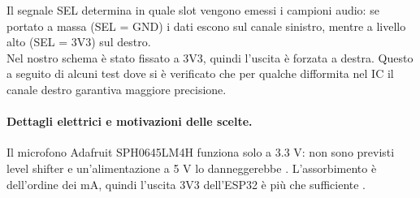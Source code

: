   
  \begin{table}[H]
    \centering
    \label{tab:i2s_pins}
    \caption{Mappatura hardware dei pin I$^2$S tra ESP32 e microfono SPH0645LM4H.}
  
  \end{table}
  
  \noindent
  Il segnale SEL determina in quale slot vengono emessi i campioni audio: se portato a massa (SEL = GND) i dati escono sul canale sinistro,
  mentre a livello alto (SEL = 3V3) sul destro. \\
  Nel nostro schema è stato fissato a 3V3, quindi l’uscita è forzata a destra.
  Questo a seguito di alcuni test dove si è verificato che per qualche difformita nel IC il canale destro garantiva maggiore precisione.\\
  
  \paragraph{Dettagli elettrici e motivazioni delle scelte.}
  Il microfono Adafruit SPH0645LM4H funziona solo a 3.3 V: non sono previsti level shifter e un’alimentazione a 5 V lo danneggerebbe \cite{digikey-sheet}. L’assorbimento è dell’ordine dei mA, quindi l’uscita 3V3 dell’ESP32 è più che sufficiente \cite{digikey-sheet}.
    
